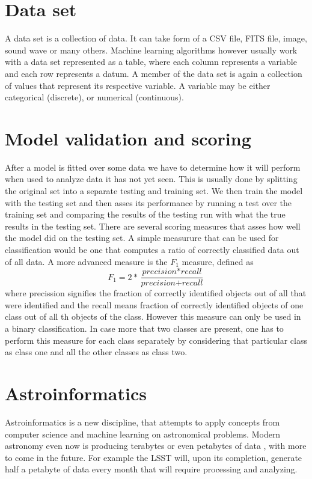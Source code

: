\documentclass[thesis=B,english]{FITthesis}[2012/10/20]
\begin{document}
\section{Data set}
A data set is a collection of data. It can take form of a CSV file, FITS file, image, sound wave or many others. Machine learning algorithms however usually work with a data set represented as a table, where each column represents a variable and each row represents a datum. A member of the data set is again a collection of values that represent its respective variable. A variable may be either categorical (discrete), or numerical (continuous).

\section{Model validation and scoring}
After a model is fitted over some data we have to determine how it will perform when used to analyze data it has not yet seen. This is usually done by splitting the original set into a separate testing and training set. We then train the model with the testing set and then asses its performance by running a test over the training set and comparing the results of the testing run with what the true results in the testing set. There are several scoring measures that asses how well the model did on the testing set. A simple measurure that can be used for classification would be one that computes a ratio of correctly classified data out of all data. A more advanced measure is the \(F_1\) measure, defined as
\[
F_1=2*\frac{\textit{precision}*\textit{recall}}{\textit{precision}+\textit{recall}}
\]
where precission signifies the fraction of correctly identified objects out of all that were identified and the recall means fraction of correctly identified objects of one class out of all th objects of the class. However this measure can only be used in a binary classification. In case more that two classes are present, one has to perform this measure for each class separately by considering that particular class as class one and all the other classes as class two.

\section{Astroinformatics}
Astroinformatics is a new discipline, that attempts to apply concepts from computer science and machine learning on astronomical problems. Modern astronomy even now is producing terabytes or even petabytes of data \cite{borne2009scientific}, with more to come in the future. For example the LSST will, upon its completion, generate half a petabyte of data every month \cite{becla2006designing} that will require processing and analyzing.
\end{document}
